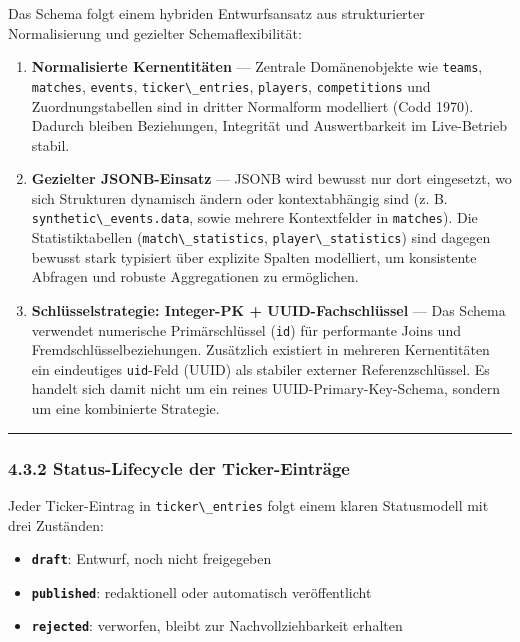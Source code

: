 Das Schema folgt einem hybriden Entwurfsansatz aus strukturierter
Normalisierung und gezielter Schemaflexibilität:

\begin{enumerate}
\def\labelenumi{\arabic{enumi}.}
\tightlist
\item
  \textbf{Normalisierte Kernentitäten} --- Zentrale Domänenobjekte wie
  \passthrough{\lstinline!teams!}, \passthrough{\lstinline!matches!},
  \passthrough{\lstinline!events!},
  \passthrough{\lstinline!ticker\_entries!},
  \passthrough{\lstinline!players!},
  \passthrough{\lstinline!competitions!} und Zuordnungstabellen sind in
  dritter Normalform modelliert (Codd 1970). Dadurch bleiben
  Beziehungen, Integrität und Auswertbarkeit im Live-Betrieb stabil.
\item
  \textbf{Gezielter JSONB-Einsatz} --- JSONB wird bewusst nur dort
  eingesetzt, wo sich Strukturen dynamisch ändern oder kontextabhängig
  sind (z. B. \passthrough{\lstinline!synthetic\_events.data!}, sowie
  mehrere Kontextfelder in \passthrough{\lstinline!matches!}). Die
  Statistiktabellen (\passthrough{\lstinline!match\_statistics!},
  \passthrough{\lstinline!player\_statistics!}) sind dagegen bewusst
  stark typisiert über explizite Spalten modelliert, um konsistente
  Abfragen und robuste Aggregationen zu ermöglichen.
\item
  \textbf{Schlüsselstrategie: Integer-PK + UUID-Fachschlüssel} --- Das
  Schema verwendet numerische Primärschlüssel
  (\passthrough{\lstinline!id!}) für performante Joins und
  Fremdschlüsselbeziehungen. Zusätzlich existiert in mehreren
  Kernentitäten ein eindeutiges \passthrough{\lstinline!uid!}-Feld
  (UUID) als stabiler externer Referenzschlüssel. Es handelt sich damit
  nicht um ein reines UUID-Primary-Key-Schema, sondern um eine
  kombinierte Strategie.
\end{enumerate}

\begin{center}\rule{0.5\linewidth}{0.5pt}\end{center}

\subsubsection{4.3.2 Status-Lifecycle der
Ticker-Einträge}\label{status-lifecycle-der-ticker-eintruxe4ge}

Jeder Ticker-Eintrag in \passthrough{\lstinline!ticker\_entries!} folgt
einem klaren Statusmodell mit drei Zuständen:

\begin{itemize}
\tightlist
\item
  \textbf{\passthrough{\lstinline!draft!}}: Entwurf, noch nicht
  freigegeben
\item
  \textbf{\passthrough{\lstinline!published!}}: redaktionell oder
  automatisch veröffentlicht
\item
  \textbf{\passthrough{\lstinline!rejected!}}: verworfen, bleibt zur
  Nachvollziehbarkeit erhalten
\end{itemize}

